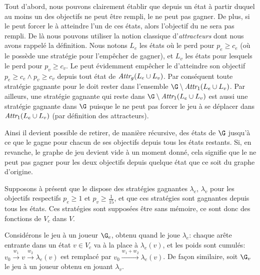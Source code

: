 Tout d'abord, nous pouvons clairement établir que depuis un état à partir duquel au moins un des objectifs ne peut être rempli, le \jo ne peut pas gagner.
De plus, si le \ji peut forcer le \jo à atteindre l'un de ces états, alors l'objectif du \jo ne sera pas rempli.
De là nous pouvons utiliser la notion classique d'\emph{attracteurs} dont nous avons rappelé la définition.
Nous notons $L_e$ les états où le \jo perd pour $p_e \geq c_e$ (\cad où le \ji possède une stratégie pour l'empêcher de gagner), et $L_v$ les états pour lesquels le \jo perd pour $p_v \geq c_v$.
Le \ji peut évidemment empêcher le \jo d'atteindre son objectif $p_e \geq c_e \wedge p_v \geq c_v$ depuis tout état de $\textit{Attr}_{g}(L_e \cup L_v)$.
Par conséquent toute stratégie gagnante pour le \jo doit rester dans l'ensemble $\G \setminus\attractor{1}(L_e \cup L_v)$.
Par ailleurs, une stratégie gagnante qui reste dans $\G \setminus\attractor{1}(L_e \cup L_v)$ est aussi une stratégie gagnante dans $\G$ puisque le \ji ne peut pas forcer le jeu à se déplacer dans $\textit{Attr}_{1}(L_e \cup L_v)$ (par définition des attracteurs).

Ainsi il devient possible de retirer, de manière récursive, des états de $\G$ jusqu'à ce que le \jo gagne pour chacun de ses objectifs depuis tous les états restants.
Si, en revanche, le graphe de jeu devient vide à un moment donné, cela signifie que le \jo ne peut pas gagner pour les deux objectifs depuis quelque état que ce soit du graphe d'origine.

Supposons à présent que le \jo dispose des stratégies gagnantes $\lambda_e$, $\lambda_v$ pour les objectifs respectifs $p_e \geq 1$ et $p_v \geq \frac1{15}$, et que ces stratégies sont gagnantes depuis tous les états.
Ces stratégies sont supposées être sans mémoire, ce sont donc des fonctions de $V_c$ dans $V$.

Considérons le jeu à un joueur $\G_e$, obtenu quand le \jo joue $\lambda_e$: chaque arête entrante dans un état $v \in V_c$ va à la place à $\lambda_e(v)$, et les poids sont cumulés: $v_0 \xrightarrow{w_1} v \xrightarrow{w_2} \lambda_e(v)$ est remplacé par $v_0 \xrightarrow{w_1+w_2} \lambda_e(v)$.
De façon similaire, soit $\G_v$ le jeu à un joueur obtenu en jouant $\lambda_v$.

